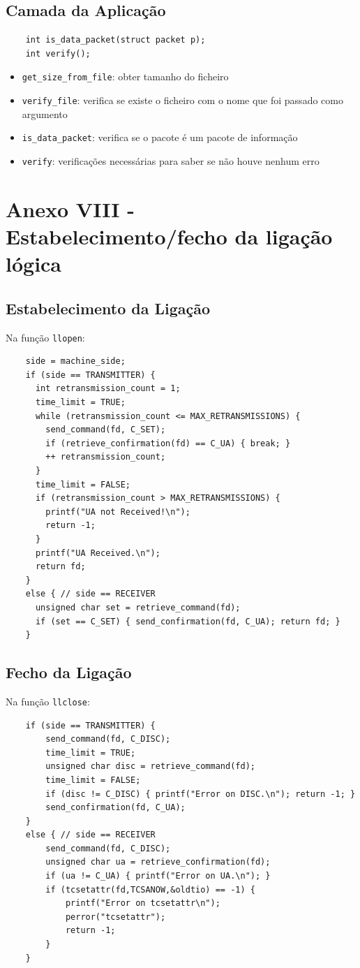 \documentclass[article, a4paper, 11pt, oneside]{memoir}
\begin{document}
\subsection{Camada da Aplicação}
\begin{lstlisting}
    int is_data_packet(struct packet p);
    int verify();
\end{lstlisting}

\begin{itemize}
    \item \verb|get_size_from_file|: obter tamanho do ficheiro
    \item \verb|verify_file|: verifica se existe o ficheiro com o nome que
     foi passado como argumento
    \item \verb|is_data_packet|: verifica se o pacote é um pacote de informação
    \item \verb|verify|: verificações necessárias para saber se não houve nenhum
    erro
\end{itemize}

\section{Anexo VIII - Estabelecimento/fecho da ligação lógica}

\subsection{Estabelecimento da Ligação}
Na função \verb|llopen|:
\begin{lstlisting}
    side = machine_side;
    if (side == TRANSMITTER) {
      int retransmission_count = 1;
      time_limit = TRUE;
      while (retransmission_count <= MAX_RETRANSMISSIONS) {
        send_command(fd, C_SET);
        if (retrieve_confirmation(fd) == C_UA) { break; }
        ++ retransmission_count;
      }
      time_limit = FALSE;
      if (retransmission_count > MAX_RETRANSMISSIONS) {
        printf("UA not Received!\n");
        return -1;
      }
      printf("UA Received.\n");
      return fd;
    }
    else { // side == RECEIVER
      unsigned char set = retrieve_command(fd);
      if (set == C_SET) { send_confirmation(fd, C_UA); return fd; }
    }
\end{lstlisting}

\subsection{Fecho da Ligação}
Na função \verb|llclose|:
\begin{lstlisting}
    if (side == TRANSMITTER) {
        send_command(fd, C_DISC);
        time_limit = TRUE;
        unsigned char disc = retrieve_command(fd);
        time_limit = FALSE;
        if (disc != C_DISC) { printf("Error on DISC.\n"); return -1; }
        send_confirmation(fd, C_UA);
    }
    else { // side == RECEIVER
        send_command(fd, C_DISC);
        unsigned char ua = retrieve_confirmation(fd);
        if (ua != C_UA) { printf("Error on UA.\n"); }
        if (tcsetattr(fd,TCSANOW,&oldtio) == -1) {
            printf("Error on tcsetattr\n");
            perror("tcsetattr");
            return -1;
        }
    }
\end{lstlisting}
\end{document}
